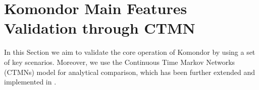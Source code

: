 \documentclass[a4paper]{article}
\begin{document}

\section{Komondor Main Features Validation through CTMN}
\label{section:validations}
	In this Section we aim to validate the core operation of Komondor by using a set of key scenarios. Moreover, we use the Continuous Time Markov Networks (CTMNs) model \cite{bellalta2014throughput} for analytical comparison, which has been further extended and implemented in \cite{barrachina2017dynamic}. 

\end{document}
